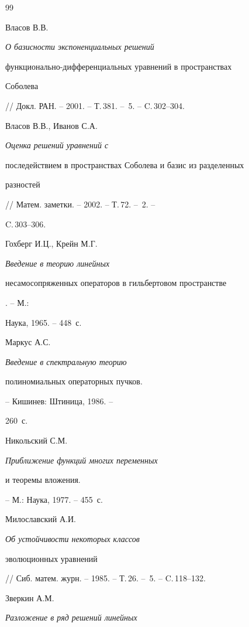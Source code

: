 \begin{thebibliography}{99}


Власов В.В. {\it О базисности экспоненциальных решений


функционально-дифференциальных уравнений в пространствах


Соболева} // Докл. РАН. -- 2001. -- Т.\,381. -- \No\,5. -- C.\,302--304.







Власов В.В., Иванов С.А. {\it Оценка решений уравнений с


последействием в пространствах Соболева и базис из разделенных


разностей} // Матем. заметки. -- 2002. -- Т.\,72. -- \No\,2. --


C.\,303--306.







Гохберг И.Ц., Крейн М.Г. {\it Введение в теорию линейных


несамосопряженных операторов в гильбертовом пространстве}. -- М.:


Наука, 1965. -- 448~с.










Маркус А.С. {\it Введение в спектральную теорию


полиномиальных операторных пучков.} -- Кишинев: Штиница, 1986. --


260~с.







Никольский С.М. {\it Приближение функций многих переменных


и теоремы вложения.} -- М.: Наука, 1977. -- 455~с.





 Милославский А.И. {\it Об устойчивости некоторых классов


эволюционных уравнений}


// Сиб. матем. журн. -- 1985. -- Т.\,26. -- \No\,5. -- C.\,118--132.







Зверкин А.М. {\it Разложение в ряд решений линейных


}
\end{thebibliography}
